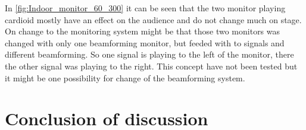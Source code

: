 In \autoref{fig:Indoor_monitor_60_300} it can be seen that the two monitor playing cardioid mostly have an effect on the audience and do not change much on stage. On change to the monitoring system might be that those two monitors was changed with only one beamforming monitor, but feeded with to signals and different beamforming. So one signal is playing to the left of the monitor, there the other signal was playing to the right. This concept have not been tested but it might be one possibility for change of the beamforming system.


\section{Conclusion of discussion}
